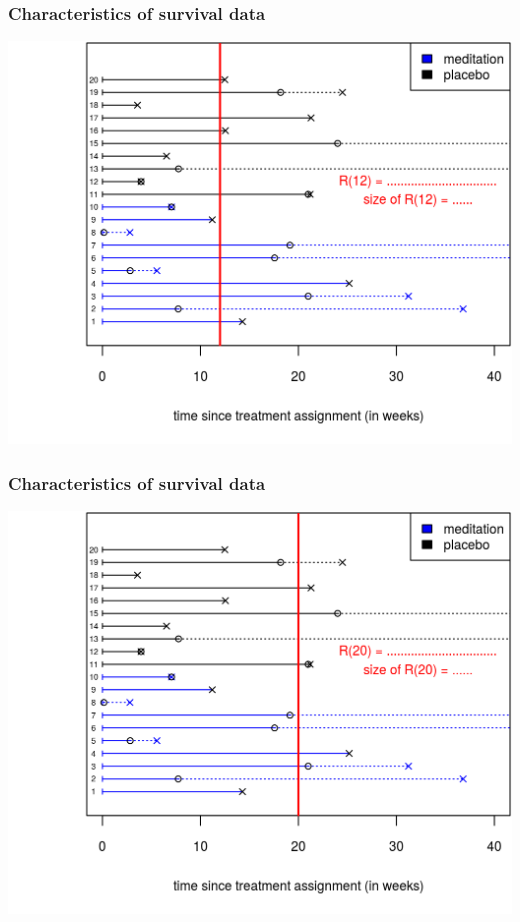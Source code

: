 \documentclass[12pt, 
hyperref={colorlinks=true, linkcolor=blue, urlcolor=cyan},dvipsnames]{beamer}
\begin{document}
\begin{frame}
\frametitle{Characteristics of survival data}
\begin{center}
\includegraphics[height=0.8\textheight]{figs/risk_set_movie_4.png}
\end{center}
\end{frame}

\begin{frame}
\frametitle{Characteristics of survival data}
\begin{center}
\includegraphics[height=0.8\textheight]{figs/risk_set_movie_5.png}
\end{center}
\end{frame}
\end{document}
